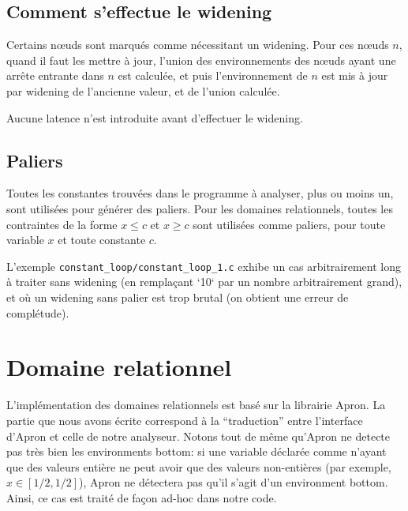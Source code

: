 \documentclass{scrartcl}
\begin{document}
\subsection*{Comment s'effectue le widening}
Certains n\oe{}uds sont marqués comme nécessitant un widening. Pour ces n\oe{}uds \(n\), quand il faut
les mettre à jour, l'union des environnements des n\oe{}uds ayant une arrête entrante dans \(n\)
est calculée, et puis l'environnement de \(n\) est mis à jour par widening de l'ancienne valeur,
et de l'union calculée.\par
Aucune latence n'est introduite avant d'effectuer le widening.

\subsection*{Paliers}
Toutes les constantes trouvées dans le programme à analyser, plus ou moins un, sont utilisées
pour générer des paliers. Pour les domaines relationnels, toutes les contraintes de la forme
\(x\leq c\) et \(x\geq c\) sont utilisées comme paliers, pour toute variable \(x\) et toute
constante \(c\).\par
L'exemple \verb|constant_loop/constant_loop_1.c| exhibe un cas arbitrairement long à traiter
sans widening (en remplaçant `10` par un nombre arbitrairement grand), et où un widening sans
palier est trop brutal (on obtient une erreur de complétude).

\section*{Domaine relationnel}
L'implémentation des domaines relationnels est basé sur la librairie Apron. La partie que nous
avons écrite correspond à la ``traduction'' entre l'interface d'Apron et celle de notre
analyseur. Notons tout de même qu'Apron ne detecte pas très bien les environments bottom: si
une variable déclarée comme n'ayant que des valeurs entière ne peut avoir que des valeurs
non-entières (par exemple, \(x\in[1/2, 1/2]\)), Apron ne détectera pas qu'il s'agit d'un
environment bottom. Ainsi, ce cas est traité de façon ad-hoc dans notre code.
\end{document}
